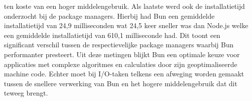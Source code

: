 ten koste van een hoger middelengebruik.
Als laatste werd ook de installatietijd onderzocht bij de package managers. Hierbij had Bun een 
gemiddelde installatietijd van 24,9 milliseconden wat 24,5 keer sneller was dan Node.js welke een gemiddelde installatietijd van 610,1 milliseconde had.
Dit toont een significant verschil tussen de respectievelijke package managers waarbij Bun performanter presteert.
Uit deze metingen blijkt Bun een optimale keuze voor applicaties met complexe algoritmes en calculaties door zijn geoptimaliseerde machine code.
Echter moet bij I/O-taken telkens een afweging worden gemaakt tussen de snellere verwerking van Bun en het hogere middelengebruik dat dit teweeg brengt.


